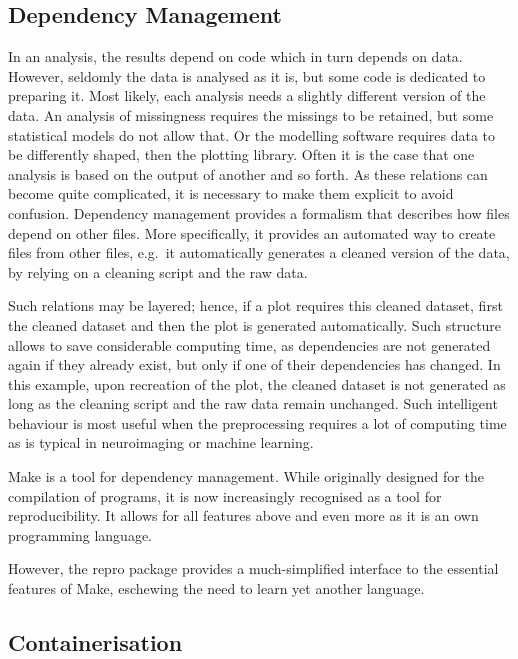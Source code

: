 \documentclass[12pt,a4paper,twoside]{article}
\begin{document}
\hypertarget{dependency-management}{%
\subsection{Dependency Management}\label{dependency-management}}

In an analysis, the results depend on code which in turn depends on data.
However, seldomly the data is analysed as it is, but some code is dedicated to preparing it.
Most likely, each analysis needs a slightly different version of the data.
An analysis of missingness requires the missings to be retained, but some statistical models do not allow that.
Or the modelling software requires data to be differently shaped, then the plotting library.
Often it is the case that one analysis is based on the output of another and so forth.
As these relations can become quite complicated, it is necessary to make them explicit to avoid confusion.
Dependency management provides a formalism that describes how files depend on other files.
More specifically, it provides an automated way to create files from other files, e.g.~it automatically generates a cleaned version of the data, by relying on a cleaning script and the raw data.

Such relations may be layered; hence, if a plot requires this cleaned dataset, first the cleaned dataset and then the plot is generated automatically.
Such structure allows to save considerable computing time, as dependencies are not generated again if they already exist, but only if one of their dependencies has changed.
In this example, upon recreation of the plot, the cleaned dataset is not generated as long as the cleaning script and the raw data remain unchanged.
Such intelligent behaviour is most useful when the preprocessing requires a lot of computing time as is typical in neuroimaging or machine learning.

Make is a tool for dependency management. While originally designed for the compilation of programs, it is now increasingly recognised as a tool for reproducibility.
It allows for all features above and even more as it is an own programming language.

However, the repro package provides a much-simplified interface to the essential features of Make, eschewing the need to learn yet another language.

\hypertarget{containerisation}{%
\subsection{Containerisation}\label{containerisation}}
\end{document}
